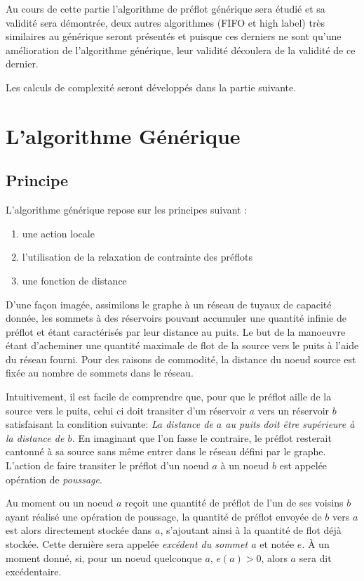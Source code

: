 Au cours de cette partie l'algorithme de préflot générique sera étudié et sa validité sera
démontrée, deux autres algorithmes (FIFO et high label) très similaires au générique seront
présentés et puisque ces derniers ne sont qu'une amélioration de l'algorithme générique, leur
validité découlera de la validité de ce dernier.

Les calculs de complexité seront développés dans la partie suivante.

\section{L'algorithme Générique}

\subsection{Principe}

L'algorithme générique repose sur les principes suivant :
\begin{enumerate}
	\item une action locale
	\item l'utilisation de la relaxation de contrainte des préflots
	\item une fonction de distance
\end{enumerate}

D'une façon imagée, assimilons le graphe à un réseau de tuyaux de capacité donnée, les sommets à des
réservoirs pouvant accumuler une quantité infinie de préflot et étant caractérisés par leur distance au
puits. Le but de la manoeuvre étant d'acheminer une quantité maximale de flot de la source vers le
puits à l'aide du réseau fourni. Pour des raisons de commodité, la distance du noeud source est fixée
au nombre de sommets dans le réseau.

Intuitivement, il est facile de comprendre que, pour que le préflot aille de la source vers le puits,
celui ci doit transiter d'un réservoir $a$ vers un réservoir $b$ satisfaisant la condition suivante:
\emph{La distance de $a$ au puits doit être supérieure à la distance de $b$.} En imaginant que l'on
fasse le contraire, le préflot resterait cantonné à sa source sans même entrer dans le réseau défini
par le graphe. L'action de faire transiter le préflot d'un noeud $a$ à un noeud $b$ est appelée
opération de \emph{poussage}.

Au moment ou un noeud $a$ reçoit une quantité de préflot de l'un de ses voisins $b$ ayant réalisé une
opération de poussage, la quantité de préflot envoyée de $b$ vers $a$ est alors directement stockée
dans $a$, s'ajoutant ainsi à la quantité de flot déjà stockée. Cette dernière sera appelée
\emph{excédent du sommet $a$} et notée $e$. À un moment donné, si, pour un noeud quelconque $a$,
$e(a) > 0$, alors $a$ sera dit excédentaire.


